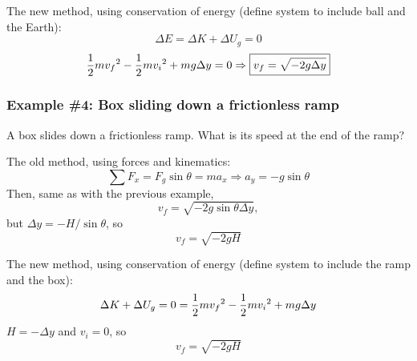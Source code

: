 The new method, using conservation of energy (define system to include ball and the Earth):
$$\Delta{E}=\Delta{K}+\Delta{U_g}=0$$
$$\frac{1}{2}mv_f\displaystyle^2-\frac{1}{2}mv_i\displaystyle^2+mg\Delta{y}=0\Rightarrow \boxed{v_f=\sqrt{-2g\Delta{y}}}$$

\subsubsection*{Example \#4: Box sliding down a frictionless ramp}
A box slides down a frictionless ramp. What is its speed at the end of the ramp?

The old method, using forces and kinematics:
$$\sum F_x=F_g\sin\theta=ma_x\Rightarrow a_y=-g\sin\theta$$
Then, same as with the previous example,
$$v_f=\sqrt{-2g\sin\theta\Delta{y}},$$
but $\Delta{y}=-H/\sin\theta$, so
$$\boxed{v_f=\sqrt{-2gH}}$$

The new method, using conservation of energy (define system to include the ramp and the box):
$$\Delta K+\Delta U_g=0=\frac{1}{2}mv_f\displaystyle^2-\frac{1}{2}mv_i\displaystyle^2+mg\Delta{y}$$
$H=-\Delta{y}$ and $v_i=0$, so
$$\boxed{v_f=\sqrt{-2gH}}$$

\clearpage
